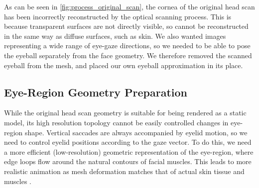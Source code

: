 As can be seen in \autoref{fig:process_original_scan}, the cornea of the original head scan has been incorrectly reconstructed by the optical scanning process.
This is because transparent surfaces are not directly visible, so cannot be reconstructed in the same way as diffuse surfaces, such as skin.
We also wanted images representing a wide range of eye-gaze directions, so we needed to be able to pose the eyeball separately from the face geometry.
We therefore removed the scanned eyeball from the mesh, and placed our own eyeball approximation in its place.

\subsection{Eye-Region Geometry Preparation}

While the original head scan geometry is suitable for being rendered as a static model, its high resolution topology cannot be easily controlled changes in eye-region shape.
Vertical saccades are always accompanied by eyelid motion, so we need to control eyelid positions according to the gaze vector.
To do this, we need a more efficient (low-resolution) geometric representation of the eye-region, where edge loops flow around the natural contours of facial muscles.
This leads to more realistic animation as mesh deformation matches that of actual skin tissue and muscles \cite{orvalho2012facial}.


